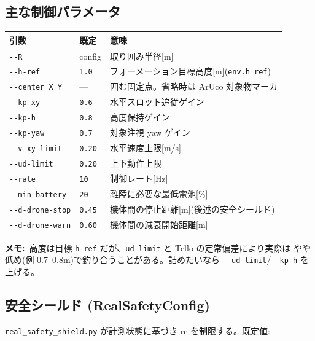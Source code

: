 \documentclass[11pt,a4paper]{ltjsarticle}
\newcommand{\code}[1]{\texttt{\small #1}}
\newcommand{\note}[1]{\par\smallskip\noindent\textbf{メモ:}~#1\par\smallskip}
\begin{document}
\subsection{主な制御パラメータ}
\begin{longtable}{@{}p{3.4cm}p{2.0cm}p{9.6cm}@{}}
\toprule
\textbf{引数} & \textbf{既定} & \textbf{意味} \\
\midrule
\endhead
\code{-{}-R} & config & 取り囲み半径[m] \\
\code{-{}-h-ref} & \code{1.0} & フォーメーション目標高度[m](\code{env.h\_ref})\\
\code{-{}-center X Y} & --- & 囲む固定点。省略時は ArUco 対象物マーカ \\
\code{-{}-kp-xy} & \code{0.6} & 水平スロット追従ゲイン \\
\code{-{}-kp-h} & \code{0.8} & 高度保持ゲイン \\
\code{-{}-kp-yaw} & \code{0.7} & 対象注視 yaw ゲイン \\
\code{-{}-v-xy-limit} & \code{0.20} & 水平速度上限[m/s] \\
\code{-{}-ud-limit} & \code{0.20} & 上下動作上限 \\
\code{-{}-rate} & \code{10} & 制御レート[Hz] \\
\code{-{}-min-battery} & \code{20} & 離陸に必要な最低電池[\%] \\
\code{-{}-d-drone-stop} & \code{0.45} & 機体間の停止距離[m](後述の安全シールド)\\
\code{-{}-d-drone-warn} & \code{0.60} & 機体間の減衰開始距離[m] \\
\bottomrule
\end{longtable}

\note{高度は目標 \code{h\_ref} だが、\code{ud-limit} と Tello の定常偏差により実際は
やや低め(例 0.7--0.8m)で釣り合うことがある。詰めたいなら \code{-{}-ud-limit}/\code{-{}-kp-h} を上げる。}

\subsection{安全シールド (RealSafetyConfig)}
\code{real\_safety\_shield.py} が計測状態に基づき rc を制限する。既定値:
\end{document}
